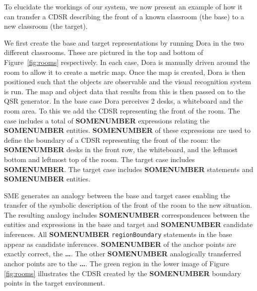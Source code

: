 \documentclass[letterpaper]{article}
\newcommand{\fw}[1]{\texttt{#1}}
\begin{document}
To elucidate the workings of our system, we now present an example of how it can transfer a CDSR describing the front of a known classroom (the base) to a new classroom (the target). 

We first create the base and target representations by running Dora in the two different classrooms. These are pictured in the top and bottom of Figure~\ref{fig:rooms} respectively. In each case, Dora is manually driven around the room to allow it to create a metric map. Once the map is created, Dora is then positioned such that the objects are observable and the visual recognition system is run. The map and object data that results from this is then passed on to the QSR generator. In the base case Dora perceives 2 desks, a whiteboard and the room area. To this we add the CDSR representing the front of the room. The case includes a total of \textbf{SOMENUMBER} expressions relating the \textbf{SOMENUMBER} entities. \textbf{SOMENUMBER} of these expressions are used to define the boundary of a CDSR representing the front of the room: the \textbf{SOMENUMBER} desks in the front row, the whiteboard, and the leftmost bottom and leftmost top of the room. The target case includes \textbf{SOMENUMBER}. The target case includes \textbf{SOMENUMBER} statements and \textbf{SOMENUMBER} entities.

SME generates an analogy between the base and target cases enabling the transfer of the symbolic description of the front of the room to the new situation. The resulting analogy includes \textbf{SOMENUMBER} correspondences between the entities and expressions in the base and target and \textbf{SOMENUMBER} candidate inferences.  All \textbf{SOMENUMBER} \fw{regionBoundary} statements in the base appear as candidate inferences. \textbf{SOMENUMBER} of the anchor points are exactly correct, the \textbf{\dots}. The other \textbf{SOMENUMBER} analogically transferred anchor points are to the \textbf{\dots}. The green region in the lower image of Figure \ref{fig:rooms} illustrates the CDSR created by the \textbf{SOMENUMBER} boundary points in the target environment. 



\end{document}
